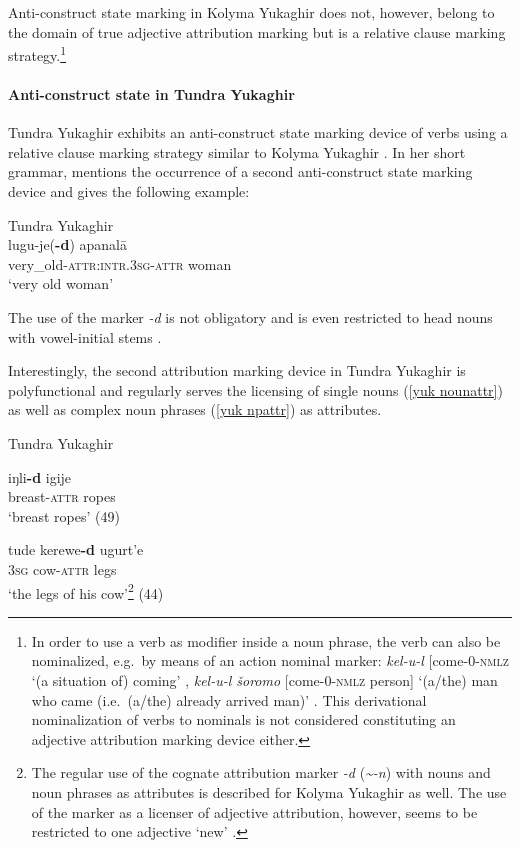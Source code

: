 Anti\hyp{}construct state marking in Kolyma Yukaghir does not, however, belong to the domain of true adjective attribution marking but is a relative clause marking strategy.\footnote{In order to use a verb as modifier inside a noun phrase, the verb can also be nominalized, e.g.~by means of an action nominal marker: \textit{kel-u-l} [come-0-\textsc{nmlz} ‘(a situation of) coming’ \cite[147]{maslova2003b}, \textit{kel-u-l šoromo} [come-0-\textsc{nmlz} person] ‘(a/the) man who came (i.e.~(a/the) already arrived man)’ \cite[67]{maslova2003b}. This derivational nominalization of verbs to nominals is not considered constituting an adjective attribution marking device either.}

\paragraph*{Anti\hyp{}construct state in Tundra Yukaghir}
Tundra Yukaghir exhibits an anti\hyp{}construct state marking device of verbs using a relative clause marking strategy similar to Kolyma Yukaghir \citep[49–50, elsewhere]{maslova2003a}. In her short grammar, \cite{maslova2003a} mentions the occurrence of a second anti\hyp{}construct state marking device and gives the following example:
\begin{exe}
\ex 	
\rm{Tundra Yukaghir \citep[50]{maslova2003a}}\\
\gll 	lugu-je(\textbf{-d}) apanalā\\
	very\_old-\textsc{attr:intr.3sg}-\textsc{attr} woman\\
\glt	‘very old woman’
\end{exe}
The use of the marker \textit{-d} is not obligatory and is even restricted to head nouns with vowel-initial stems \cite[50]{maslova2003a}.

Interestingly, the second attribution marking device in Tundra Yukaghir is polyfunctional and regularly serves the licensing of single nouns (\ref{yuk nounattr}) as well as complex noun phrases (\ref{yuk npattr}) as attributes.
\begin{exe}
\ex 
\rm{Tundra Yukaghir \citep{maslova2003a}}
\begin{xlist}
\ex
\label{yuk nounattr}
\gll	iŋli\textbf{-d} igije\\
	breast-\textsc{attr} ropes\\
\glt	‘breast ropes’ (49)

\ex
\label{yuk npattr}
\gll	tude kerewe\textbf{-d} ugurt'e\\
	\textsc{3sg} cow-\textsc{attr} legs\\
\glt	‘the legs of his cow’\footnote{The regular use of the cognate attribution marker \textit{-d} (\textit{\textasciitilde-n}) with nouns and noun phrases as attributes is described for Kolyma Yukaghir as well. The use of the marker as a licenser of adjective attribution, however, seems to be restricted to one adjective ‘new’ \citep[71]{maslova2003b}.} (44)
\end{xlist}
\end{exe}

